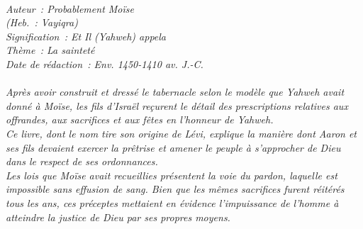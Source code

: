 \BFont
\noindent\hrulefill
{\footnotesize
\textit{
\bigskip
{\centering{}
\\Auteur~: Probablement Moïse
\\(Heb.~: Vayiqra)
\\Signification~: Et Il (Yahweh) appela
\\Thème~: La sainteté
\\Date de rédaction~: Env. 1450-1410 av. J.-C.\\}
}
\textit{
\\Après avoir construit et dressé le tabernacle selon le modèle que Yahweh avait donné à Moïse, les fils d'Israël reçurent le détail des prescriptions relatives aux offrandes, aux sacrifices et aux fêtes en l'honneur de Yahweh. 
\\Ce livre, dont le nom tire son origine de Lévi, explique la manière dont Aaron et ses fils devaient exercer la prêtrise et amener le peuple à s'approcher de Dieu dans le respect de ses ordonnances.
\\Les lois que Moïse avait recueillies présentent la voie du pardon, laquelle est impossible sans effusion de sang. Bien que les mêmes sacrifices furent réitérés tous les ans, ces préceptes mettaient en évidence l'impuissance de l'homme à atteindre la justice de Dieu par ses propres moyens.\bigskip
}
}
\par\nobreak\noindent\hrulefill
